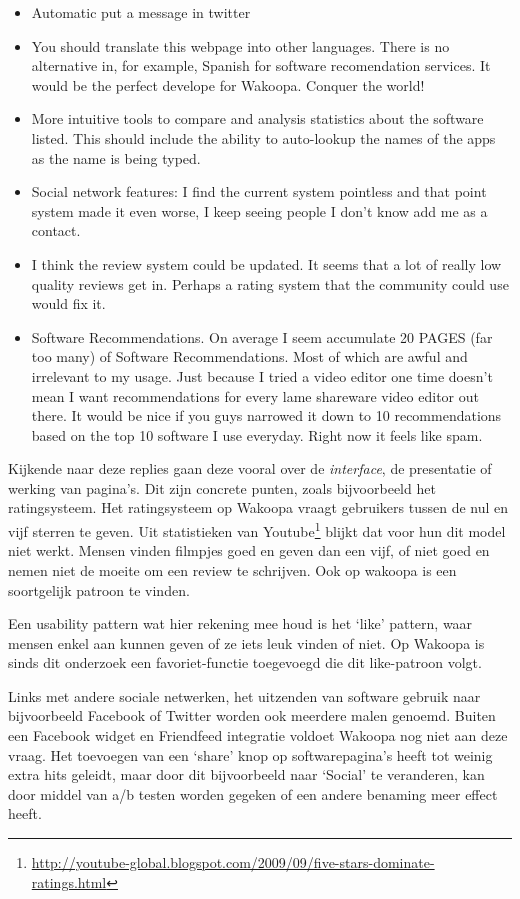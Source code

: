       \begin{itemize}
      \item Automatic put a message in twitter
      \item You should translate this webpage into other languages. There is no alternative in, for example, Spanish for software recomendation services. It would be the perfect develope for Wakoopa. Conquer the world!
      \item More intuitive tools to compare and analysis statistics about the software listed. This should include the ability to auto-lookup the names of the apps as the name is being typed.
      \item Social network features: I find the current system pointless and that point system made it even worse, I keep seeing people I don't know add me as a contact.
      \item I think the review system could be updated. It seems that a lot of really low quality reviews get in. Perhaps a rating system that the community could use would fix it.
      \item Software Recommendations. On average I seem accumulate 20 PAGES (far too many) of Software Recommendations. Most of which are awful and irrelevant to my usage. Just because I tried a video editor one time doesn't mean I want recommendations for every lame shareware video editor out there. It would be nice if you guys narrowed it down to 10 recommendations based on the top 10 software I use everyday. Right now it feels like spam.
      \end{itemize}

      Kijkende naar deze replies gaan deze vooral over de \emph{interface}, de presentatie of werking van pagina's. Dit zijn concrete punten, zoals bijvoorbeeld het ratingsysteem. Het ratingsysteem op Wakoopa vraagt gebruikers tussen de nul en vijf sterren te geven. Uit statistieken van Youtube\footnote{\url{http://youtube-global.blogspot.com/2009/09/five-stars-dominate-ratings.html}} blijkt dat voor hun dit model niet werkt. Mensen vinden filmpjes goed en geven dan een vijf, of niet goed en nemen niet de moeite om een review te schrijven. Ook op wakoopa is een soortgelijk patroon te vinden.

      Een usability pattern wat hier rekening mee houd is het `like' pattern, waar mensen enkel aan kunnen geven of ze iets leuk vinden of niet. Op Wakoopa is sinds dit onderzoek een favoriet-functie toegevoegd die dit like-patroon volgt.

      Links met andere sociale netwerken, het uitzenden van software gebruik naar bijvoorbeeld Facebook of Twitter worden ook meerdere malen genoemd. Buiten een Facebook widget en Friendfeed integratie voldoet Wakoopa nog niet aan deze vraag. Het toevoegen van een `share' knop op softwarepagina's heeft tot weinig extra hits geleidt, maar door dit bijvoorbeeld naar `Social' te veranderen, kan door middel van a/b testen worden gegeken of een andere benaming meer effect heeft.

